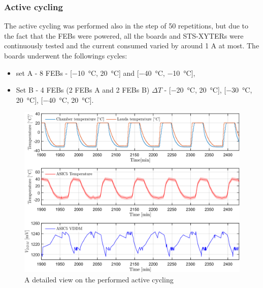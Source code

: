 \subsubsection{Active cycling}
The active cycling was performed also in the step of 50 repetitions, but due to the fact that the \glspl{FEB} were powered, all the boards and \gls{STS}-XYTERs were continuously tested and the current consumed varied by around 1 A at most. The boards underwent the followings cycles:
\begin{itemize}
    \item set A - 8 \glspl{FEB} - [\SI{-10}{\celsius}, \SI{20}{\celsius}] and [\SI{-40}{\celsius}, \SI{-10}{\celsius}],
    \item Set B - 4 \glspl{FEB} (2 \glspl{FEB} A and 2 \glspl{FEB} B)  $\Delta T$ - [\SI{-20}{\celsius}, \SI{20}{\celsius}], [\SI{-30}{\celsius}, \SI{20}{\celsius}], [\SI{-40}{\celsius}, \SI{20}{\celsius}].
\end{itemize}

\begin{figure}[!h]
\centering
\includegraphics[width=0.57\columnwidth]{Chapter4/images/FEB0ASIC5COMP.png}
\caption{A detailed view on the performed active cycling}
\label{fig_active_detailed}
\end{figure}

